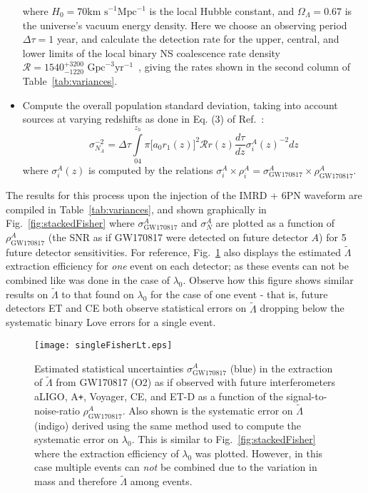 \documentclass[prd,twocolumn,nofootinbib,superscriptaddress,amsmath,amssymb]{revtex4-1}
\begin{document}
\begin{itemize}
where $H_0 = 70 \text{km s}^{-1}\text{Mpc}^{-1}$ is the local Hubble constant, and $\Omega_{\Lambda}=0.67$ is the universe's vacuum energy density.
Here we choose an observing period $\Delta \tau = 1$ year, and calculate the detection rate for the upper, central, and lower limits of the local binary NS coalescence rate density $\mathcal{R}=1540^{+3200}_{-1220} \text{ Gpc}^{-3}\text{yr}^{-1}$~\cite{Abbott2017}, giving the rates shown in the second column of Table~\ref{tab:variances}.
\item Compute the overall population standard deviation, taking into account sources at varying redshifts as done in Eq. (3) of Ref.~\cite{Takahiro}:
\begin{equation}
\sigma_{N_A}^{-2}=\Delta \tau \int\limits^{z_h}_04 \pi \lbrack a_0 r_1(z)\rbrack^2 \mathcal{R}r(z)\frac{d\tau}{dz}\sigma^A_i(z)^{-2}dz
\end{equation}
where $\sigma_i^A(z)$ is computed by the relations $\sigma_i^A \times \rho_i^A = \sigma_{\text{GW170817}}^A \times \rho_{\text{GW170817}}^A$.
\end{itemize}

The results for this process upon the injection of the IMRD + 6PN waveform are compiled in Table~\ref{tab:variances}, and shown graphically in Fig.~\ref{fig:stackedFisher} where $\sigma^A_{\text{GW170817}}$ and $\sigma^A_N$ are plotted as a function of $\rho^A_{\text{GW170817}}$ (the SNR as if GW170817 were detected on future detector $A$) for 5 future detector sensitivities.
For reference, Fig.~\ref{fig:singleFisherLt} also displays the estimated $\tilde\Lambda$ extraction efficiency for \emph{one} event on each detector; as these events can not be combined like was done in the case of $\lambda_0$.
Observe how this figure shows similar results on $\tilde\Lambda$ to that found on $\lambda_0$ for the case of one event - that is, future detectors ET and CE both observe statistical errors on $\tilde\Lambda$ dropping below the systematic binary Love errors for a single event.
\begin{figure}
\begin{center} 
\texttt{[image: singleFisherLt.eps]}
\end{center}
\caption{
Estimated statistical uncertainties $\sigma^A_{\text{GW170817}}$ (blue) in the extraction of $\tilde\Lambda$ from GW170817 (O2) as if observed with future interferometers aLIGO, A\texttt{+}, Voyager, CE, and ET-D as a function of the signal-to-noise-ratio $\rho^A_{\text{GW170817}}$.
Also shown is the systematic error on $\tilde\Lambda$ (indigo) derived using the same method used to compute the systematic error on $\lambda_0$.
This is similar to Fig.~\ref{fig:stackedFisher} where the extraction efficiency of $\lambda_0$ was plotted.
However, in this case multiple events can \emph{not} be combined due to the variation in mass and therefore $\tilde\Lambda$ among events.
}
\label{fig:singleFisherLt}
\end{figure} 
\end{document}
